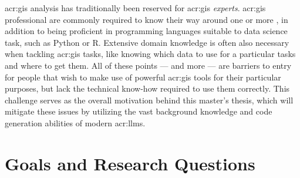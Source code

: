 \acrshort{acr:gis} analysis has traditionally been reserved for \acrshort{acr:gis} \textit{experts}. \acrshort{acr:gis} professional are commonly required to know their way around one or more , in addition to being proficient in programming languages suitable to data science task, such as Python or R. Extensive domain knowledge is often also necessary when tackling \acrshort{acr:gis} tasks, like knowing which data to use for a particular tasks and where to get them. All of these points --- and more --- are barriers to entry for people that wish to make use of powerful \acrshort{acr:gis} tools for their particular purposes, but lack the technical know-how required to use them correctly. This challenge serves as the overall motivation behind this master's thesis, which will mitigate these issues by utilizing the vast background knowledge and code generation abilities of modern \glspl{acr:llm}.

\section{Goals and Research Questions}
\label{sec:goals-and-research-questions}

